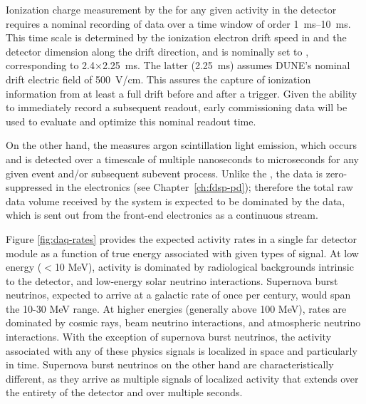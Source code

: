 Ionization charge measurement by the  for any given activity in the detector requires a nominal recording of data over a time window of order \SIrange{1}{10}{\milli\second}. 
This time scale is determined by the ionization electron drift speed in \lar and the detector dimension along the drift direction, and is nominally set to \spreadout, corresponding to 2.4$\times$\SI{2.25}{\milli\second}.
The latter (\SI{2.25}{\milli\second}) assumes DUNE's nominal drift electric field of 500~V/cm.
This assures the capture of ionization information from at least a full drift before and after a trigger.
Given the ability to  immediately record a subsequent readout, early commissioning data will be used to evaluate and optimize this nominal readout time.

On the other hand, the  measures argon scintillation light emission, which
occurs and is detected over a timescale of multiple nanoseconds to
microseconds for
any given event and/or subsequent subevent process. Unlike the ,
the  data is zero-suppressed in
the  electronics (see Chapter~\ref{ch:fdsp-pd}); therefore the total raw data volume received by
the  system is expected to be dominated by
the  data, which is sent out from the front-end electronics as a continuous stream.
 
Figure \ref{fig:daq-rates} provides the expected activity rates in a
single far detector module as a function of true energy associated
with given types of signal.
At low energy ($<$10 MeV), activity is dominated by radiological backgrounds
intrinsic to the detector, and
low-energy solar neutrino interactions. Supernova burst neutrinos,
expected to arrive at a galactic  rate of once per century, 
would span the 10-30 MeV range. At higher energies (generally
above 100 MeV), rates are dominated by cosmic rays, beam neutrino interactions,
and atmospheric neutrino interactions. With the exception of supernova
burst neutrinos, the activity associated with any of these physics
signals is localized in space and particularly in time. Supernova burst
neutrinos on the other hand are characteristically different, as they arrive as multiple
signals of localized activity that extends over the entirety of the
detector and over multiple seconds. %

